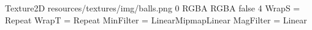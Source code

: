 Texture2D
resources/textures/img/balls.png
0
RGBA
RGBA
false
4
WrapS = Repeat
WrapT = Repeat
MinFilter = LinearMipmapLinear
MagFilter = Linear
